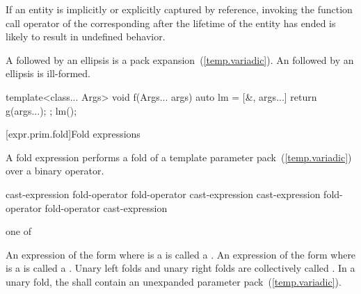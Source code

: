 \pnum
\begin{note} If an entity is implicitly or explicitly captured by reference,
invoking the function call operator of the corresponding 
after the lifetime of the entity has ended is likely to result in undefined behavior.
\end{note}

\pnum
A  followed by an ellipsis is a pack
expansion~(\ref{temp.variadic}). An  followed by an
ellipsis is ill-formed.
\begin{example}
\begin{codeblock}
template<class... Args>
void f(Args... args) {
  auto lm = [&, args...] { return g(args...); };
  lm();
}
\end{codeblock}
\end{example}%
%

[expr.prim.fold]{Fold expressions}%

\pnum
A fold expression performs a fold of a template parameter
pack~(\ref{temp.variadic}) over a binary operator.

\begin{bnf}
\br
    \terminal{(} cast-expression fold-operator  \terminal{)}\br
    \terminal{(}  fold-operator cast-expression \terminal{)}\br
    \terminal{(} cast-expression fold-operator  fold-operator cast-expression \terminal{)}
\end{bnf}

\begin{bnf}
 \textnormal{one of}\br
    \terminal{+ }\quad\terminal{- }\quad\terminal{* }\quad\terminal{/ }\quad\terminal{\% }\quad\terminal{\caret }\quad\terminal{\& }\quad\terminal{| }\quad\terminal{\shl\ }\quad\terminal{\shr }\br
    \terminal{+=}\quad\terminal{-=}\quad\terminal{*=}\quad\terminal{/=}\quad\terminal{\%=}\quad\terminal{\caret=}\quad\terminal{\&=}\quad\terminal{|=}\quad\terminal{\shl=}\quad\terminal{\shr=}\quad\terminal{=}\br
    \terminal{==}\quad\terminal{!=}\quad\terminal{< }\quad\terminal{> }\quad\terminal{<=}\quad\terminal{>=}\quad\terminal{\&\&}\quad\terminal{||}\quad\terminal{,  }\quad{}\quad\terminal{->*}
\end{bnf}

\pnum
{}%
An expression of the form
  
where  is a 
is called a .
An expression of the form
  
where  is a 
is called a .
Unary left folds and unary right folds
are collectively called .
In a unary fold,
the 
shall contain an unexpanded parameter pack~(\ref{temp.variadic}).

